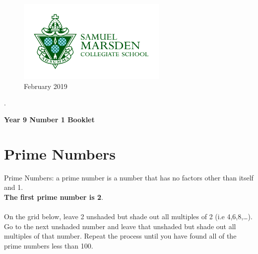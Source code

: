 \documentclass[a4paper,12pt]{article}
\begin{document}
\thispagestyle{empty}	
	\Large
	\begin{figure} 
		\centering
		\includegraphics[height=4cm]{Marsden_green_on_white.jpg}
		\caption*{February 2019}
	\end{figure}
	.
\vspace{3cm}
	\begin{center}
			\textbf{Year 9 Number 1 Booklet}
	\end{center}

	\vspace{3cm}
	
	\normalsize
	\newpage
	\tableofcontents
	\newpage
	
	\section{Prime Numbers}
	Prime Numbers: a prime number is a number that has no factors other than itself and 1.\\
	\textbf{The first prime number is 2}.\\\\
	On the grid below, leave 2 unshaded but shade out all multiples of 2 (i.e 4,6,8,…).\\ 
	Go to the next unshaded number and leave that unshaded but shade out all multiples of that number.
	Repeat the process until you have found all of the prime numbers less than 100.
	
	\begin{center}
\end{center}
\end{document}
